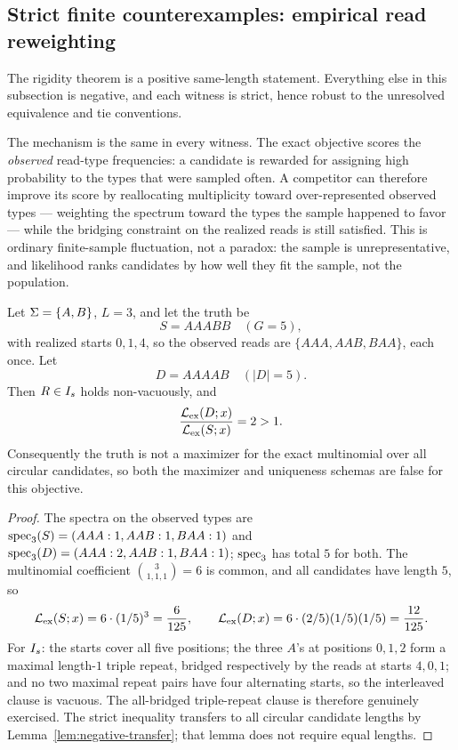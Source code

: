 \subsection{Strict finite counterexamples: empirical read reweighting}

The rigidity theorem is a positive same-length statement. Everything else in
this subsection is negative, and each witness is strict, hence robust to the
unresolved equivalence and tie conventions.

The mechanism is the same in every witness. The exact objective scores the
\emph{observed} read-type frequencies: a candidate is rewarded for assigning
high probability to the types that were sampled often. A competitor can
therefore improve its score by reallocating multiplicity toward
over-represented observed types --- weighting the spectrum toward the types
the sample happened to favor --- while the bridging constraint on the
realized reads is still satisfied. This is ordinary finite-sample fluctuation,
not a paradox: the sample is unrepresentative, and likelihood ranks candidates
by how well they fit the sample, not the population.

\begin{theorem}
\label{thm:cex-exact}
Let $\Sigma=\{A,B\}$, $L=3$, and let the truth be
\[
  S=AAABB \quad (G=5),
\]
with realized starts $0,1,4$, so the observed reads are $\{AAA,AAB,BAA\}$, each
once. Let
\[
  D=AAAAB \quad (|D|=5).
\]
Then $R\in I_s$ holds non-vacuously, and
\[
  \frac{\mathcal{L}_{\mathrm{ex}}(D;x)}{\mathcal{L}_{\mathrm{ex}}(S;x)} = 2 > 1 .
\]
Consequently the truth is not a maximizer for the exact multinomial over all
circular candidates, so both the maximizer and uniqueness schemas are false for
this objective.
\end{theorem}

\begin{proof}
The spectra on the observed types are $\operatorname{spec}_3(S)=(AAA:1,AAB:1,BAA:1)$ and
$\operatorname{spec}_3(D)=(AAA:2,AAB:1,BAA:1)$; $\operatorname{spec}_3$ has total $5$ for both. The
multinomial coefficient $\binom{3}{1,1,1}=6$ is common, and all candidates have
length $5$, so
\[
  \mathcal{L}_{\mathrm{ex}}(S;x)=6\cdot(1/5)^3=\frac{6}{125},\qquad
  \mathcal{L}_{\mathrm{ex}}(D;x)=6\cdot(2/5)(1/5)(1/5)=\frac{12}{125}.
\]
For $I_s$: the starts cover all five positions; the three $A$'s at positions
$0,1,2$ form a maximal length-$1$ triple repeat, bridged respectively by the
reads at starts $4,0,1$; and no two maximal repeat pairs have four alternating
starts, so the interleaved clause is vacuous. The all-bridged triple-repeat
clause is therefore genuinely exercised. The strict inequality transfers to all circular candidate lengths
by Lemma~\ref{lem:negative-transfer}; that lemma does not require equal lengths. 
\end{proof}


